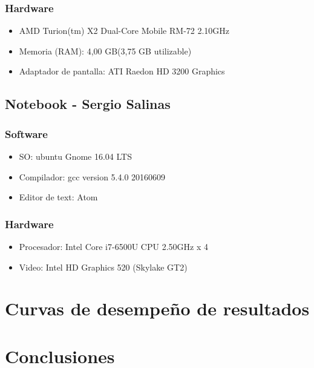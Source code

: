 \documentclass[12pt,letterpaper]{scrartcl}
\begin{document}
\subsubsection{Hardware}
\begin{itemize}
\item AMD Turion(tm) X2 Dual-Core Mobile RM-72 2.10GHz
\item Memoria (RAM): 4,00 GB(3,75 GB utilizable)
\item Adaptador de pantalla: ATI Raedon HD 3200 Graphics
\end{itemize}



\subsection{Notebook - Sergio Salinas}
\subsubsection{Software}
\begin{itemize}
\item  SO: ubuntu Gnome 16.04 LTS
\item Compilador: gcc version 5.4.0 20160609 
\item Editor de text: Atom
\end{itemize}

\subsubsection{Hardware}
\begin{itemize}
\item Procesador: Intel Core i7-6500U CPU  2.50GHz x 4 
\item Video: Intel HD Graphics 520 (Skylake GT2) 
\end{itemize}


\newpage

\section{Curvas de desempeño de resultados}
\newpage
\section{Conclusiones}
\end{document}
